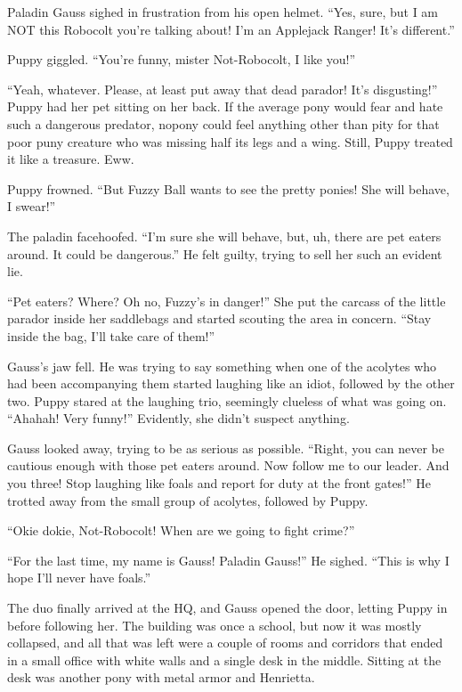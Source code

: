 Paladin Gauss sighed in frustration from his open helmet. ``Yes, sure, but I am NOT this Robocolt you're talking about! I'm an Applejack Ranger! It's different.''

Puppy giggled. ``You're funny, mister Not-Robocolt, I like you!''

``Yeah, whatever. Please, at least put away that dead parador! It's disgusting!'' Puppy had her pet sitting on her back. If the average pony would fear and hate such a dangerous predator, nopony could feel anything other than pity for that poor puny creature who was missing half its legs and a wing. Still, Puppy treated it like a treasure. Eww.

Puppy frowned. ``But Fuzzy Ball wants to see the pretty ponies! She will behave, I swear!''

The paladin facehoofed. ``I'm sure she will behave, but, uh, there are pet eaters around. It could be dangerous.'' He felt guilty, trying to sell her such an evident lie.

``Pet eaters? Where? Oh no, Fuzzy's in danger!'' She put the carcass of the little parador inside her saddlebags and started scouting the area in concern. ``Stay inside the bag, I'll take care of them!''

Gauss's jaw fell. He was trying to say something when one of the acolytes who had been accompanying them started laughing like an idiot, followed by the other two. Puppy stared at the laughing trio, seemingly clueless of what was going on. ``Ahahah! Very funny!'' Evidently, she didn't suspect anything.

Gauss looked away, trying to be as serious as possible. ``Right, you can never be cautious enough with those pet eaters around. Now follow me to our leader. And you three! Stop laughing like foals and report for duty at the front gates!'' He trotted away from the small group of acolytes, followed by Puppy.

``Okie dokie, Not-Robocolt! When are we going to fight crime?''

``For the last time, my name is Gauss! Paladin Gauss!'' He sighed. ``This is why I hope I'll never have foals.''

The duo finally arrived at the HQ, and Gauss opened the door, letting Puppy in before following her. The building was once a school, but now it was mostly collapsed, and all that was left were a couple of rooms and corridors that ended in a small office with white walls and a single desk in the middle. Sitting at the desk was another pony with metal armor and Henrietta.

